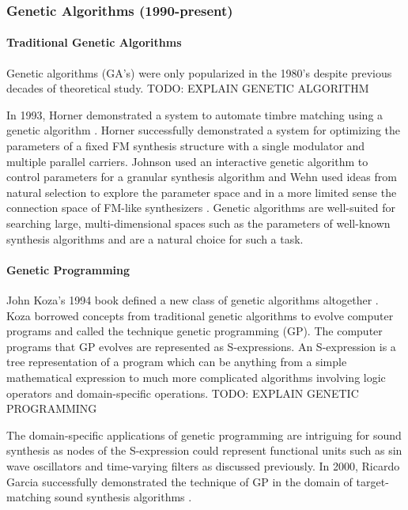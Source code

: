 \documentclass[12pt]{article}
\begin{document}
\subsubsection{Genetic Algorithms (1990-present)}
\paragraph{Traditional Genetic Algorithms}
Genetic algorithms (GA's) were only popularized in the 1980's despite previous decades of theoretical study. TODO: EXPLAIN GENETIC ALGORITHM

In 1993, Horner demonstrated a system to automate timbre matching using a genetic algorithm \citep{horner1993machine}. Horner successfully demonstrated a system for optimizing the parameters of a fixed FM synthesis structure with a single modulator and multiple parallel carriers. Johnson used an interactive genetic algorithm to control parameters for a granular synthesis algorithm \citep{johnson1999exploring} and Wehn used ideas from natural selection to explore the parameter space and in a more limited sense the connection space of FM-like synthesizers \citep{wehn1998using}. Genetic algorithms are well-suited for searching large, multi-dimensional spaces such as the parameters of well-known synthesis algorithms and are a natural choice for such a task.

\paragraph{Genetic Programming}
John Koza's 1994 book defined a new class of genetic algorithms altogether \citep{koza1992genetic}. Koza borrowed concepts from traditional genetic algorithms to evolve computer programs and called the technique genetic programming (GP). The computer programs that GP evolves are represented as S-expressions. An S-expression is a tree representation of a program which can be anything from a simple mathematical expression to much more complicated algorithms involving logic operators and domain-specific operations. TODO: EXPLAIN GENETIC PROGRAMMING
			
The domain-specific applications of genetic programming are intriguing for sound synthesis as nodes of the S-expression could represent functional units such as sin wave oscillators and time-varying filters as discussed previously. In 2000, Ricardo Garcia successfully demonstrated the technique of GP in the domain of target-matching sound synthesis algorithms \citep{garcia2000towards}.
\end{document}
